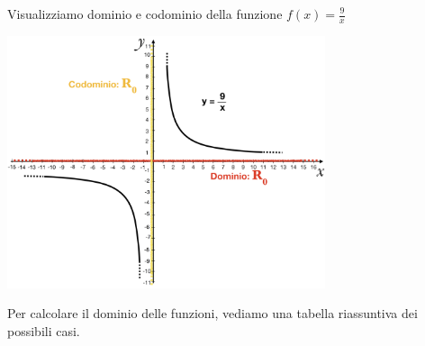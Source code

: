 \begin{minipage}{.49\textwidth}
\begin{esempio}
  Visualizziamo dominio e codominio della funzione \(f(x)=\frac{9}{x}\)
\end{esempio}
\end{minipage}
\begin{minipage}{.49\textwidth}
\begin{center}
  \centering
\includegraphics[width=0.7\textwidth]{img/2c_funz.png}
\end{center}
\end{minipage}

Per calcolare il dominio delle funzioni, vediamo una tabella riassuntiva dei 
possibili casi.


